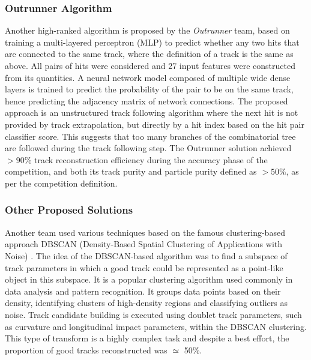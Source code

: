 
\subsubsection{Outrunner Algorithm}

Another high-ranked algorithm is proposed by the \textit{Outrunner} team, based on training a multi-layered perceptron (MLP) to predict whether any two hits that are connected to the same track, where the definition of a track is the same as above. All pairs of hits were considered and 27 input features were constructed from its quantities. A neural network model composed of multiple wide dense layers is trained to predict the probability of the pair to be on the same track, hence predicting the adjacency matrix of network connections. The proposed approach is an unstructured track following algorithm where the next hit is not provided by track extrapolation, but directly by a hit index based on the hit pair classifier score. This suggests that too many branches of the combinatorial tree are followed during the track following step. The Outrunner solution achieved $> 90\%$ track reconstruction efficiency during the accuracy phase of the competition, and both its track purity and particle purity defined as $> 50\%$, as per the competition definition.


\subsubsection{Other Proposed Solutions}

Another team used various techniques based on the famous clustering-based approach DBSCAN (Density-Based Spatial Clustering of Applications with Noise) \cite{dbscan}. The idea of the DBSCAN-based algorithm was to find a subspace of track parameters in which a good track could be represented as a point-like object in this subspace. It is a popular clustering algorithm used commonly in data analysis and pattern recognition. It groups data points based on their density, identifying clusters of high-density regions and classifying outliers as noise. Track candidate building is executed using doublet track parameters, such as curvature and longitudinal impact parameters, within the DBSCAN clustering. This type of transform is a highly complex task and despite a best effort, the proportion of good tracks reconstructed was $\simeq$ 50\%. 

